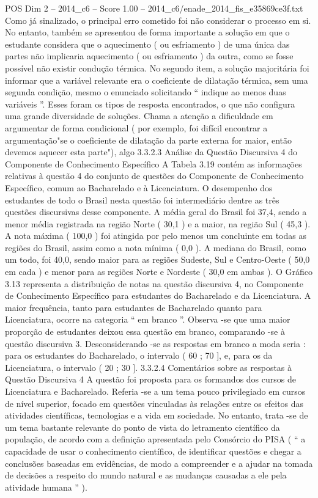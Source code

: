 \begin{textsample}{POS Dim 2 – 2014\_c6 – Score 1.00 – 2014\_c6/enade\_2014\_fis\_e35869ce3f.txt}
Como já sinalizado, o principal erro cometido foi não considerar o processo em si.
No entanto, também se apresentou de forma importante a solução em que o estudante considera que o aquecimento ( ou esfriamento ) de uma única das partes não implicaria aquecimento ( ou esfriamento ) da outra, como se fosse possível não existir condução térmica.
No segundo item, a solução majoritária foi informar que a variável relevante era o coeficiente de dilatação térmica, sem uma segunda condição, mesmo o enunciado solicitando “ indique ao menos duas variáveis ”.
Esses foram os tipos de resposta encontrados, o que não configura uma grande diversidade de soluções.
Chama a atenção a dificuldade em argumentar de forma condicional ( por exemplo, foi difícil encontrar a argumentação"se o coeficiente de dilatação da parte externa for maior, então devemos aquecer esta parte"), algo 3.3.2.3 Análise da Questão Discursiva 4 do Componente de Conhecimento Específico A Tabela 3.19 contém as informações relativas à questão 4 do conjunto de questões do Componente de Conhecimento Específico, comum ao Bacharelado e à Licenciatura.
O desempenho dos estudantes de todo o Brasil nesta questão foi intermediário dentre as três questões discursivas desse componente.
A média geral do Brasil foi 37,4, sendo a menor média registrada na região Norte ( 30,1 ) e a maior, na região Sul ( 45,3 ).
A nota máxima ( 100,0 ) foi atingida por pelo menos um concluinte em todas as regiões do Brasil, assim como a nota mínima ( 0,0 ).
A mediana do Brasil, como um todo, foi 40,0, sendo maior para as regiões Sudeste, Sul e Centro-Oeste ( 50,0 em cada ) e menor para as regiões Norte e Nordeste ( 30,0 em ambas ).
O Gráfico 3.13 representa a distribuição de notas na questão discursiva 4, no Componente de Conhecimento Específico para estudantes do Bacharelado e da Licenciatura.
A maior frequência, tanto para estudantes de Bacharelado quanto para Licenciatura, ocorre na categoria “ em branco ”.
Observa -se que uma maior proporção de estudantes deixou essa questão em branco, comparando -se à questão discursiva 3.
Desconsiderando -se as respostas em branco a moda seria : para os estudantes do Bacharelado, o intervalo ( 60 ; 70 ], e, para os da Licenciatura, o intervalo ( 20 ; 30 ]. 3.3.2.4 Comentários sobre as respostas à Questão Discursiva 4 A questão foi proposta para os formandos dos cursos de Licenciatura e Bacharelado.
Referia -se a um tema pouco privilegiado em cursos de nível superior, focado em questões vinculadas às relações entre os efeitos das atividades científicas, tecnologias e a vida em sociedade.
No entanto, trata -se de um tema bastante relevante do ponto de vista do letramento científico da população, de acordo com a definição apresentada pelo Consórcio do PISA ( “ a capacidade de usar o conhecimento científico, de identificar questões e chegar a conclusões baseadas em evidências, de modo a compreender e a ajudar na tomada de decisões a respeito do mundo natural e as mudanças causadas a ele pela atividade humana ” ).

\end{textsample}
